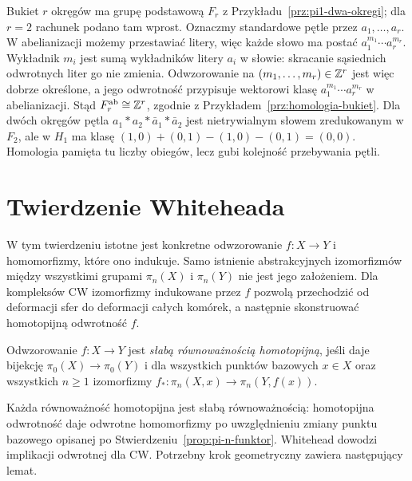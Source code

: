 \begin{przyklad}
Bukiet $r$ okręgów ma grupę podstawową $F_r$
z Przykładu~\ref{prz:pi1-dwa-okregi}; dla $r=2$ rachunek
podano tam wprost. Oznaczmy standardowe pętle przez
$a_1,\ldots,a_r$. W abelianizacji możemy przestawiać litery,
więc każde słowo ma postać $a_1^{m_1}\cdots a_r^{m_r}$.
Wykładnik $m_i$ jest sumą wykładników litery $a_i$ w słowie:
skracanie sąsiednich odwrotnych liter go nie zmienia.
Odwzorowanie na $(m_1,\ldots,m_r)\in\mathbb{Z}^r$ jest więc dobrze
określone, a jego odwrotność przypisuje wektorowi klasę
$a_1^{m_1}\cdots a_r^{m_r}$ w abelianizacji.
Stąd $F_r^{\mathrm{ab}}\cong\mathbb{Z}^r$, zgodnie z
Przykładem~\ref{prz:homologia-bukiet}.
Dla dwóch okręgów pętla $a_1*a_2*\bar a_1*\bar a_2$
jest nietrywialnym słowem zredukowanym w $F_2$, ale w $H_1$
ma klasę $(1,0)+(0,1)-(1,0)-(0,1)=(0,0)$.
Homologia pamięta tu liczby obiegów, lecz gubi kolejność
przebywania pętli.
\end{przyklad}

\section{Twierdzenie Whiteheada}
\label{sec:whitehead}

W tym twierdzeniu istotne jest konkretne odwzorowanie
$f:X\to Y$ i homomorfizmy, które ono indukuje.
Samo istnienie abstrakcyjnych izomorfizmów między wszystkimi
grupami $\pi_n(X)$ i $\pi_n(Y)$ nie jest jego założeniem.
Dla kompleksów CW izomorfizmy indukowane przez $f$ pozwolą
przechodzić od deformacji sfer do deformacji całych komórek,
a następnie skonstruować homotopijną odwrotność $f$.

\begin{definicja}
\label{def:slaba-rownowaznosc}
Odwzorowanie $f:X\to Y$ jest \emph{słabą równoważnością homotopijną},
jeśli daje bijekcję $\pi_0(X)\to\pi_0(Y)$ i dla wszystkich punktów
bazowych $x\in X$ oraz wszystkich $n\geq1$ izomorfizmy
$f_*:\pi_n(X,x)\to\pi_n(Y,f(x))$.
\end{definicja}

Każda równoważność homotopijna jest słabą równoważnością:
homotopijna odwrotność daje odwrotne homomorfizmy po uwzględnieniu
zmiany punktu bazowego opisanej po
Stwierdzeniu~\ref{prop:pi-n-funktor}.
Whitehead dowodzi implikacji odwrotnej dla CW.
Potrzebny krok geometryczny zawiera następujący lemat.

